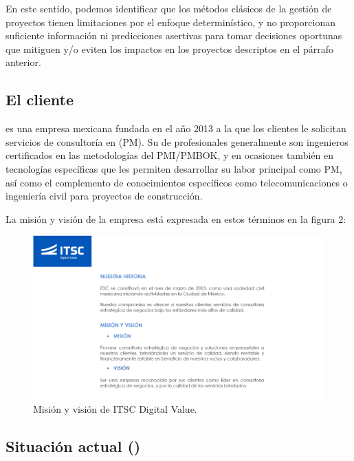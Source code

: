 \documentclass[12pt]
{charter}
\begin{document}
En este sentido, podemos identificar que los métodos clásicos de la gestión de proyectos tienen limitaciones por el enfoque determinístico, y no proporcionan suficiente información ni predicciones asertivas para tomar decisiones oportunas que mitiguen y/o eviten los impactos en los proyectos descriptos en el párrafo anterior. 

\subsection{El cliente}

\empclientename\hspace{1px} es una empresa mexicana fundada en el año 2013 a la que los clientes le solicitan servicios de consultoría en  (PM). Su  de profesionales generalmente son ingenieros certificados en las metodologías del PMI/PMBOK, y en ocasiones también en tecnologías específicas que les permiten desarrollar su labor principal como PM, así como el complemento de conocimientos específicos como telecomunicaciones o ingeniería civil para proyectos de construcción.

La misión y visión de la empresa está expresada en estos términos en la figura 2:

\begin{figure}[htpb]
\captionsetup{justification=centering,singlelinecheck=false}
\centering 
\includegraphics[width=\textwidth]{./Figuras/ITSC_Mision_Vision.pdf}
\caption{Misión y visión de ITSC Digital Value.}
\label{fig:ITSC_Mision_Vision}
\end{figure}

\subsection{Situación actual ()}
\end{document}

